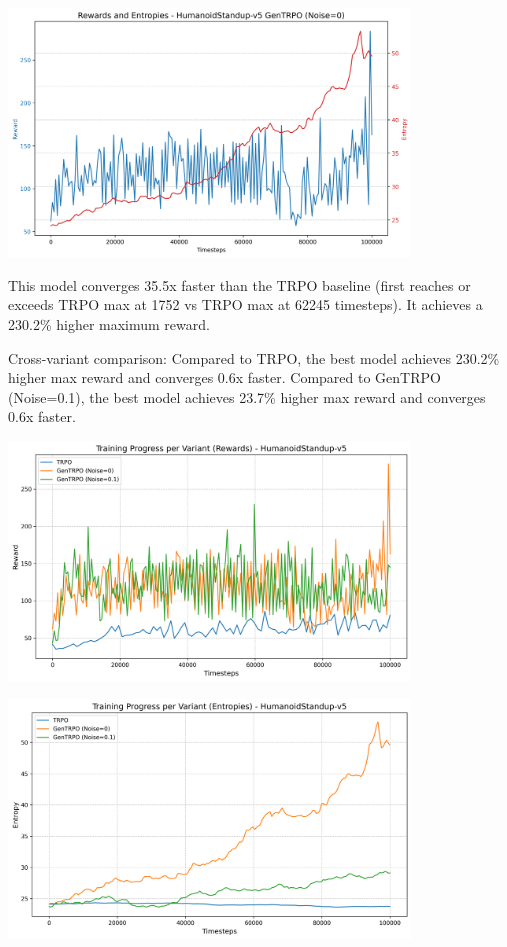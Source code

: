 \documentclass{svproc}
\begin{document}
\begin{center}
\includegraphics[width=0.8\textwidth]{graph_HumanoidStandup-v5_gentrpo_rewards_entropies.png}
\end{center}

This model converges 35.5x faster than the TRPO baseline (first reaches or exceeds TRPO max at 1752 vs TRPO max at 62245 timesteps). It achieves a 230.2\% higher maximum reward.

Cross-variant comparison: Compared to TRPO, the best model achieves 230.2\% higher max reward and converges 0.6x faster. Compared to GenTRPO (Noise=0.1), the best model achieves 23.7\% higher max reward and converges 0.6x faster. 

\begin{center}
\includegraphics[width=0.8\textwidth]{graph_rewards_HumanoidStandup-v5.png}
\end{center}

\begin{center}
\includegraphics[width=0.8\textwidth]{graph_entropies_HumanoidStandup-v5.png}
\end{center}
\end{document}
